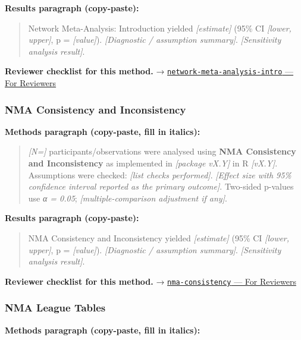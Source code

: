 \documentclass[
]{article}
\begin{document}
\textbf{Results paragraph (copy-paste):}

\begin{quote}
Network Meta-Analysis: Introduction yielded \emph{{[}estimate{]}} (95\%
CI \emph{{[}lower, upper{]}}, p = \emph{{[}value{]}}).
\emph{{[}Diagnostic / assumption summary{]}}. \emph{{[}Sensitivity
analysis result{]}}.
\end{quote}

\textbf{Reviewer checklist for this method.} →
\href{../chapters/15-metaanalysis/network-meta-analysis-intro.Rmd\#for-reviewers}{\texttt{network-meta-analysis-intro}
--- For Reviewers}

\subsubsection{NMA Consistency and
Inconsistency}\label{nma-consistency-and-inconsistency}

\textbf{Methods paragraph (copy-paste, fill in italics):}

\begin{quote}
\emph{{[}N={]}} participants/observations were analysed using
\textbf{NMA Consistency and Inconsistency} as implemented in
\emph{{[}package vX.Y{]}} in R \emph{{[}vX.Y{]}}. Assumptions were
checked: \emph{{[}list checks performed{]}}. \emph{{[}Effect size with
95\% confidence interval reported as the primary outcome{]}}. Two-sided
p-values use \emph{α = 0.05}; \emph{{[}multiple-comparison adjustment if
any{]}}.
\end{quote}

\textbf{Results paragraph (copy-paste):}

\begin{quote}
NMA Consistency and Inconsistency yielded \emph{{[}estimate{]}} (95\% CI
\emph{{[}lower, upper{]}}, p = \emph{{[}value{]}}). \emph{{[}Diagnostic
/ assumption summary{]}}. \emph{{[}Sensitivity analysis result{]}}.
\end{quote}

\textbf{Reviewer checklist for this method.} →
\href{../chapters/15-metaanalysis/nma-consistency.Rmd\#for-reviewers}{\texttt{nma-consistency}
--- For Reviewers}

\subsubsection{NMA League Tables}\label{nma-league-tables}

\textbf{Methods paragraph (copy-paste, fill in italics):}
\end{document}
